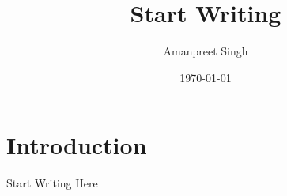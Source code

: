 \documentclass{article}[a4paper,12pt]
\title{Start Writing}
\author{Amanpreet Singh}
\date{\today}
\begin{document}
  \maketitle %
  \newpage %
  \tableofcontents

\section{Introduction}
Start Writing Here

\end{document}
